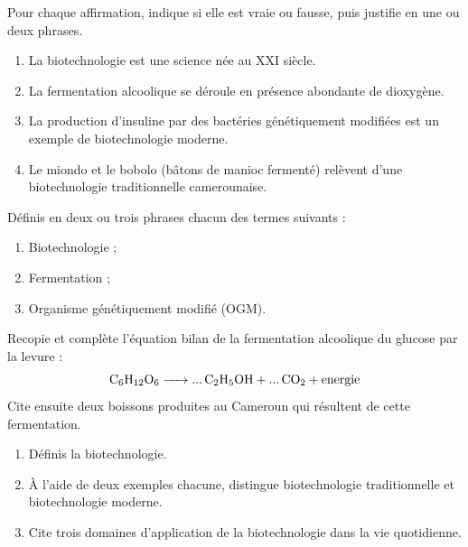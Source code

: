 \documentclass[11pt]{article}
\newcounter{popsec}
\newcounter{popsub}
\newcommand{\courssub}[1]{%
  \stepcounter{popsub}%
  \par\vspace{9pt}\noindent{\popxbold\fontsize{11.5}{13}\selectfont\color{popink}{\color{poporange}\thepopsec.\thepopsub}\hspace{6pt}#1}\par\nopagebreak\vspace{4pt}
}
\begin{document}
\begin{exercice}
Pour chaque affirmation, indique si elle est vraie ou fausse, puis justifie en une ou deux phrases.
\begin{enumerate}
\item La biotechnologie est une science née au XXI siècle.
\item La fermentation alcoolique se déroule en présence abondante de dioxygène.
\item La production d'insuline par des bactéries génétiquement modifiées est un exemple de biotechnologie moderne.
\item Le \og miondo \fg{} et le \og bobolo \fg{} (bâtons de manioc fermenté) relèvent d'une biotechnologie traditionnelle camerounaise.
\end{enumerate}
\end{exercice}

\begin{exercice}[Définitions]
Définis en deux ou trois phrases chacun des termes suivants :
\begin{enumerate}
\item Biotechnologie ;
\item Fermentation ;
\item Organisme génétiquement modifié (OGM).
\end{enumerate}
\end{exercice}

\begin{exercice}
Recopie et complète l'équation bilan de la fermentation alcoolique du glucose par la levure :
\[ \ce{C6H12O6 -> ... C2H5OH + ... CO2 + energie} \]
Cite ensuite deux boissons produites au Cameroun qui résultent de cette fermentation.
\end{exercice}

\courssub{Je m'entraîne}

\begin{exercice}
\begin{enumerate}
\item Définis la biotechnologie.
\item À l'aide de deux exemples chacune, distingue biotechnologie traditionnelle et biotechnologie moderne.
\item Cite trois domaines d'application de la biotechnologie dans la vie quotidienne.
\end{enumerate}
\end{exercice}
\end{document}
